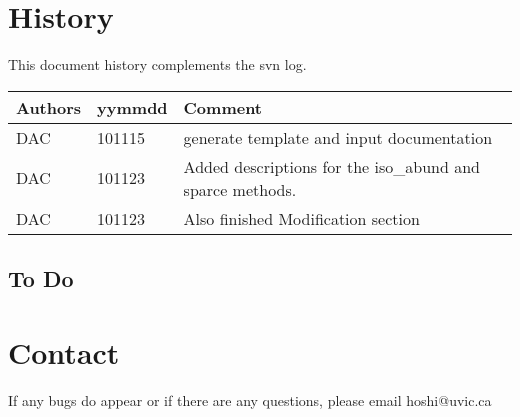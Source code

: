 \section{History} 
This document history complements the svn log.

\begin{tabular*}{\textwidth}{lll}
\hline
Authors & yymmdd & Comment \\
\hline
DAC & 101115 & generate template and input documentation\\
DAC & 101123 & Added descriptions for the iso_abund and sparce methods.\\
DAC & 101123 & Also finished Modification section\\
\hline
\end{tabular*}
\subsection{To Do}



\section{Contact}
If any bugs do appear or if there are any questions, please email hoshi@uvic.ca



%
%
%
%
